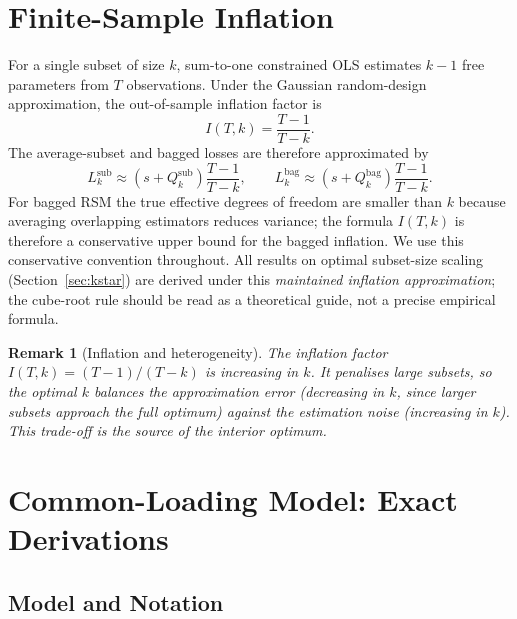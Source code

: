 \documentclass[12pt,a4paper]{article}
\newtheorem{remark}{Remark}
\theoremstyle{definition}
\begin{document}
\section{Finite-Sample Inflation}
\label{sec:inflation}

For a single subset of size $k$, sum-to-one constrained OLS estimates $k-1$
free parameters from $T$ observations. Under the Gaussian random-design
approximation, the out-of-sample inflation factor is
\begin{equation}\label{eq:I}
I(T,k) = \frac{T-1}{T-k}.
\end{equation}
The average-subset and bagged losses are therefore approximated by
\begin{equation}\label{eq:Lsub}
L_k^{\mathrm{sub}} \approx (s+Q_k^{\mathrm{sub}})\frac{T-1}{T-k},
\qquad
L_k^{\mathrm{bag}} \approx (s+Q_k^{\mathrm{bag}})\frac{T-1}{T-k}.
\end{equation}
For bagged RSM the true effective degrees of freedom are smaller than $k$
because averaging overlapping estimators reduces variance; the formula
$I(T,k)$ is therefore a conservative upper bound for the bagged inflation.
We use this conservative convention throughout. All results on optimal
subset-size scaling (Section~\ref{sec:kstar}) are derived under this
\emph{maintained inflation approximation}; the cube-root rule should be
read as a theoretical guide, not a precise empirical formula.

\begin{remark}[Inflation and heterogeneity]
The inflation factor $I(T,k)=(T-1)/(T-k)$ is increasing in $k$. It
penalises large subsets, so the optimal $k$ balances the approximation
error (decreasing in $k$, since larger subsets approach the full optimum)
against the estimation noise (increasing in $k$). This trade-off is the
source of the interior optimum.
\end{remark}

\section{Common-Loading Model: Exact Derivations}
\label{sec:cl}

\subsection{Model and Notation}
\end{document}
